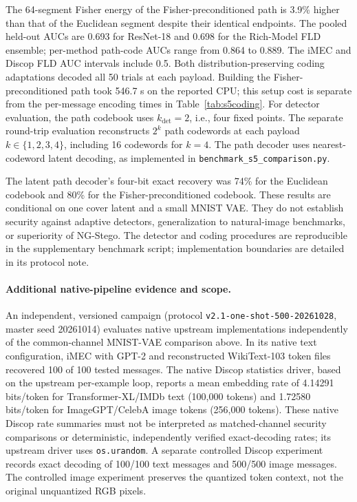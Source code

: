 \documentclass[a4paper,fleqn]{cas-dc}
\begin{document}
The 64-segment Fisher energy of the Fisher-preconditioned path is 3.9\% higher
than that of the Euclidean segment despite their identical endpoints. The
pooled held-out AUCs are 0.693 for ResNet-18 and 0.698 for the Rich-Model FLD
ensemble; per-method path-code AUCs range from 0.864 to 0.889. The iMEC and
Discop FLD AUC intervals include 0.5. Both distribution-preserving coding
adaptations decoded all 50 trials at each payload. Building the
Fisher-preconditioned path took 546.7 s on the reported CPU; this setup cost is
separate from the per-message encoding times in Table~\ref{tab:s5coding}. For detector evaluation, the path codebook uses $k_{\mathrm{det}}=2$, i.e., four fixed points. The separate round-trip evaluation reconstructs $2^k$ path codewords at each payload $k\in\{1,2,3,4\}$, including 16 codewords for $k=4$. The path decoder uses nearest-codeword latent decoding, as implemented in \texttt{benchmark\_s5\_comparison.py}.\par
The latent path
decoder's four-bit exact recovery was 74\% for the Euclidean codebook and 80\%
for the Fisher-preconditioned codebook. These results are conditional on one
cover latent and a small MNIST VAE. They do not establish security against
adaptive detectors, generalization to natural-image benchmarks, or superiority
of NG-Stego. The detector and coding procedures are reproducible in the
supplementary benchmark script; implementation boundaries are detailed in its
protocol note.


\paragraph{Additional native-pipeline evidence and scope.}
An independent, versioned campaign (protocol \texttt{v2.1-one-shot-500-20261028}, master seed 20261014) evaluates native upstream implementations independently of the common-channel MNIST-VAE comparison above. In its native text configuration, iMEC with GPT-2 and reconstructed WikiText-103 token files recovered 100 of 100 tested messages. The native Discop statistics driver, based on the upstream per-example loop, reports a mean embedding rate of 4.14291 bits/token for Transformer-XL/IMDb text (100,000 tokens) and 1.72580 bits/token for ImageGPT/CelebA image tokens (256,000 tokens). These native Discop rate summaries must not be interpreted as matched-channel security comparisons or deterministic, independently verified exact-decoding rates; its upstream driver uses \texttt{os.urandom}. A separate controlled Discop experiment records exact decoding of 100/100 text messages and 500/500 image messages. The controlled image experiment preserves the quantized token context, not the original unquantized RGB pixels.
\end{document}
